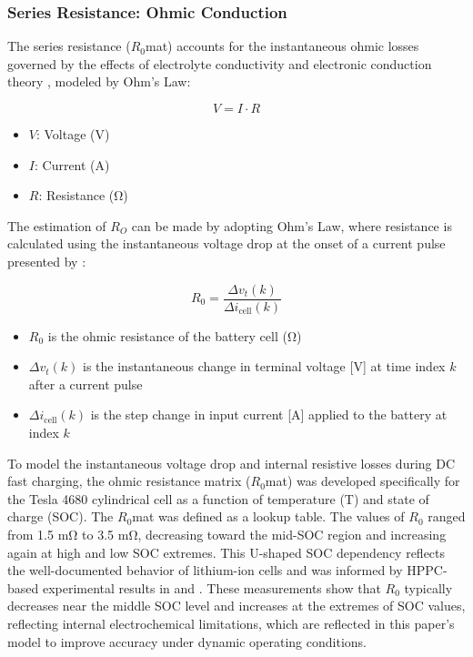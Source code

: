 \documentclass[conference]{IEEEtran}
\begin{document}
\subsubsection{\textbf{Series Resistance: Ohmic Conduction}}


 The series resistance ($R_0$mat) accounts for the instantaneous ohmic losses governed by the effects of electrolyte conductivity and electronic conduction theory \cite{xie2020facile}, modeled by Ohm's Law:

 
\begin{equation}
V = I \cdot R
\end{equation}

\begin{itemize}
    \item $V$: Voltage (V)
    \item $I$: Current (A)
    \item $R$: Resistance (\si{\ohm})
    \end{itemize}

The estimation of $R_O$ can be made by adopting Ohm's Law, where resistance is calculated using the instantaneous voltage drop at the onset of a current pulse presented by \cite{mondal}:

\begin{equation}
R_0 =\frac{\Delta v_t(k)}{\Delta i_{\text{cell}}(k)}
\end{equation}

\begin{itemize}
    \item  $R_0$ is the ohmic resistance of the battery cell (\si{\ohm})
    \item $\Delta v_t(k)$ is the instantaneous change in terminal voltage [V] at time index $k$ after a current pulse
    \item $\Delta i_\text {cell}(k)$ is the step change in input current [A] applied to the battery at index $k$
\end{itemize}


To model the instantaneous voltage drop and internal resistive losses during DC fast charging, the ohmic resistance matrix ($R_0$mat) was developed specifically for the Tesla 4680 cylindrical cell as a function of temperature (T) and state of charge (SOC). The $R_0$mat was defined as a lookup table. The values of $R_0$ ranged from 1.5 m\si{\ohm} to 3.5 m\si{\ohm}, decreasing toward the mid-SOC region and increasing again at high and low SOC extremes. This U-shaped SOC dependency reflects the well-documented behavior of lithium-ion cells and was informed by HPPC-based experimental results in \cite{Wang} and \cite{mondal}. These measurements show that $R_0$ typically decreases near the middle SOC level and increases at the extremes of SOC values, reflecting internal electrochemical limitations, which are reflected in this paper's model to improve accuracy under dynamic operating conditions.
\end{document}
